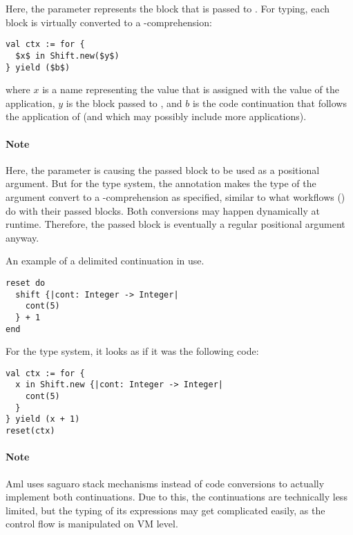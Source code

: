 Here, the  parameter represents the block that is passed to . For typing, each  block is virtually converted to a -comprehension:
\begin{lstlisting}
val ctx := for {
  $x$ in Shift.new($y$)
} yield ($b$)
\end{lstlisting}
where $x$ is a name representing the value that is assigned with the value of the  application, $y$ is the block passed to , and $b$ is the code continuation that follows the application of  (and which may possibly include more  applications). 

\paragraph{Note}
Here, the  parameter is causing the passed block to be used as a positional argument. But for the type system, the annotation  makes the type of the argument convert to a -comprehension as specified, similar to what workflows () do with their passed blocks. Both conversions may happen dynamically at runtime. Therefore, the passed block is eventually a regular positional argument anyway. 

\example An example of a delimited continuation in use. 
\begin{lstlisting}
reset do
  shift {|cont: Integer -> Integer|
    cont(5)
  } + 1
end
\end{lstlisting}
For the type system, it looks as if it was the following code:
\begin{lstlisting}
val ctx := for {
  x in Shift.new {|cont: Integer -> Integer|
    cont(5)
  }
} yield (x + 1)
reset(ctx)
\end{lstlisting}

\paragraph{Note}
Aml uses saguaro stack mechanisms instead of code conversions to actually implement both continuations. Due to this, the continuations are technically less limited, but the typing of its expressions may get complicated easily, as the control flow is manipulated on VM level.






